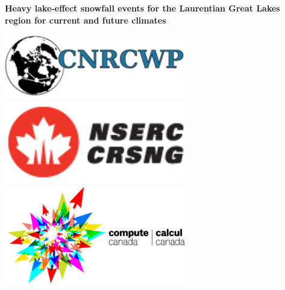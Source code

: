 \documentclass[a0b,landscape]{a0poster}
\begin{document}
\captionsetup{justification=raggedright}



\noindent\begin{minipage}[b]{\linewidth}
\centering
\noindent \huge \color{NavyBlue} \textbf{Heavy lake-effect snowfall events for the Laurentian Great Lakes region for current and future climates} \color{Black}\\[0.25cm] %
\noindent\begin{minipage}[c]{0.25\linewidth}
      \center
      \includegraphics[width=8cm, align=c]{logo_cnrcwp.png} \includegraphics[width=8cm, align=c]{nserc_narrow} \includegraphics[width=8cm,align=c]{compute_canada_transparent_small} %
\end{minipage}
%
\hfill
%
\begin{minipage}[c]{0.45\linewidth}

\end{minipage}
\end{minipage}
\end{document}
